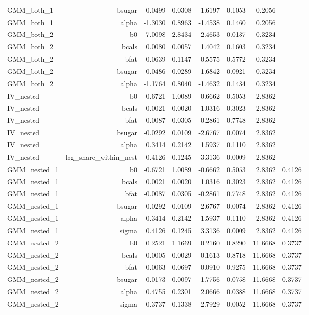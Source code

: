 \begin{longtable}{@{}lrrrrrrr@{}}
GMM\_both\_1 & bsugar & -0.0499 & 0.0308 & -1.6197 & 0.1053 & 0.2056 &  \\
GMM\_both\_1 & alpha & -1.3030 & 0.8963 & -1.4538 & 0.1460 & 0.2056 &  \\
GMM\_both\_2 & b0 & -7.0098 & 2.8434 & -2.4653 & 0.0137 & 0.3234 &  \\
GMM\_both\_2 & bcals & 0.0080 & 0.0057 & 1.4042 & 0.1603 & 0.3234 &  \\
GMM\_both\_2 & bfat & -0.0639 & 0.1147 & -0.5575 & 0.5772 & 0.3234 &  \\
GMM\_both\_2 & bsugar & -0.0486 & 0.0289 & -1.6842 & 0.0921 & 0.3234 &  \\
GMM\_both\_2 & alpha & -1.1764 & 0.8040 & -1.4632 & 0.1434 & 0.3234 &  \\
IV\_nested & b0 & -0.6721 & 1.0089 & -0.6662 & 0.5053 & 2.8362 &  \\
IV\_nested & bcals & 0.0021 & 0.0020 & 1.0316 & 0.3023 & 2.8362 &  \\
IV\_nested & bfat & -0.0087 & 0.0305 & -0.2861 & 0.7748 & 2.8362 &  \\
IV\_nested & bsugar & -0.0292 & 0.0109 & -2.6767 & 0.0074 & 2.8362 &  \\
IV\_nested & alpha & 0.3414 & 0.2142 & 1.5937 & 0.1110 & 2.8362 &  \\
IV\_nested & log\_share\_within\_nest & 0.4126 & 0.1245 & 3.3136 & 0.0009 & 2.8362 &  \\
GMM\_nested\_1 & b0 & -0.6721 & 1.0089 & -0.6662 & 0.5053 & 2.8362 & 0.4126 \\
GMM\_nested\_1 & bcals & 0.0021 & 0.0020 & 1.0316 & 0.3023 & 2.8362 & 0.4126 \\
GMM\_nested\_1 & bfat & -0.0087 & 0.0305 & -0.2861 & 0.7748 & 2.8362 & 0.4126 \\
GMM\_nested\_1 & bsugar & -0.0292 & 0.0109 & -2.6767 & 0.0074 & 2.8362 & 0.4126 \\
GMM\_nested\_1 & alpha & 0.3414 & 0.2142 & 1.5937 & 0.1110 & 2.8362 & 0.4126 \\
GMM\_nested\_1 & sigma & 0.4126 & 0.1245 & 3.3136 & 0.0009 & 2.8362 & 0.4126 \\
GMM\_nested\_2 & b0 & -0.2521 & 1.1669 & -0.2160 & 0.8290 & 11.6668 & 0.3737 \\
GMM\_nested\_2 & bcals & 0.0005 & 0.0029 & 0.1613 & 0.8718 & 11.6668 & 0.3737 \\
GMM\_nested\_2 & bfat & -0.0063 & 0.0697 & -0.0910 & 0.9275 & 11.6668 & 0.3737 \\
GMM\_nested\_2 & bsugar & -0.0173 & 0.0097 & -1.7756 & 0.0758 & 11.6668 & 0.3737 \\
GMM\_nested\_2 & alpha & 0.4755 & 0.2301 & 2.0666 & 0.0388 & 11.6668 & 0.3737 \\
GMM\_nested\_2 & sigma & 0.3737 & 0.1338 & 2.7929 & 0.0052 & 11.6668 & 0.3737 \\
\bottomrule
\end{longtable}
\endgroup
